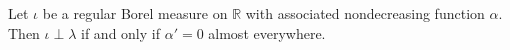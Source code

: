 Let $\iota$ be a regular Borel measure on $\mathbb{R}$ with associated nondecreasing function $\alpha$. Then $\iota \perp \lambda$ if and only if $\alpha' = 0$ almost everywhere.
